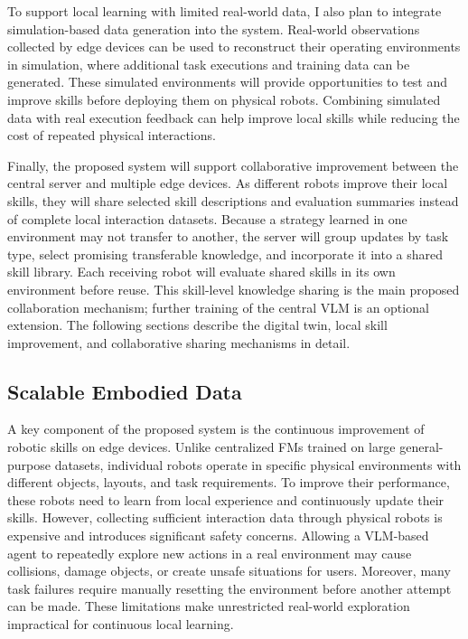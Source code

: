 \documentclass[11pt]{article}
\begin{document}
To support local learning with limited real-world data, I also plan to integrate simulation-based data generation into the system. Real-world observations collected by edge devices can be used to reconstruct their operating environments in simulation, where additional task executions and training data can be generated. These simulated environments will provide opportunities to test and improve skills before deploying them on physical robots. Combining simulated data with real execution feedback can help improve local skills while reducing the cost of repeated physical interactions.

Finally, the proposed system will support collaborative improvement between the central server and multiple edge devices. As different robots improve their local skills, they will share selected skill descriptions and evaluation summaries instead of complete local interaction datasets. Because a strategy learned in one environment may not transfer to another, the server will group updates by task type, select promising transferable knowledge, and incorporate it into a shared skill library. Each receiving robot will evaluate shared skills in its own environment before reuse. This skill-level knowledge sharing is the main proposed collaboration mechanism; further training of the central VLM is an optional extension. The following sections describe the digital twin, local skill improvement, and collaborative sharing mechanisms in detail.

\subsection{Scalable Embodied Data}
\label{subsec:embodied_data}

A key component of the proposed system is the continuous improvement of robotic skills on edge devices. Unlike centralized FMs trained on large general-purpose datasets, individual robots operate in specific physical environments with different objects, layouts, and task requirements. To improve their performance, these robots need to learn from local experience and continuously update their skills. However, collecting sufficient interaction data through physical robots is expensive and introduces significant safety concerns. Allowing a VLM-based agent to repeatedly explore new actions in a real environment may cause collisions, damage objects, or create unsafe situations for users. Moreover, many task failures require manually resetting the environment before another attempt can be made. These limitations make unrestricted real-world exploration impractical for continuous local learning.
\end{document}
